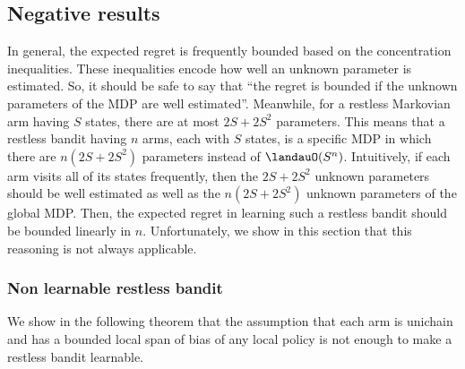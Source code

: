 \subsection{Negative results}

In general, the expected regret is frequently bounded based on the concentration inequalities. 
These inequalities encode how well an unknown parameter is estimated.
So, it should be safe to say that ``the regret is bounded if the unknown parameters of the MDP are well estimated''.
Meanwhile, for a restless Markovian arm having $S$ states, there are at most $2S+2S^2$ parameters.
This means that a restless bandit having $n$ arms, each with $S$ states, is a specific MDP in which there are $n(2S+2S^2)$ parameters instead of $\landauO(S^{n})$.
Intuitively, if each arm visits all of its states frequently, then the $2S+2S^2$ unknown parameters should be well estimated as well as the $n(2S+2S^2)$ unknown parameters of the global MDP.
Then, the expected regret in learning such a restless bandit should be bounded linearly in $n$.
Unfortunately, we show in this section that this reasoning is not always applicable. 

\subsubsection{Non learnable restless bandit}

We show in the following theorem that the assumption that each arm is unichain and has a bounded local span of bias of any local policy is not enough to make a restless bandit learnable.

